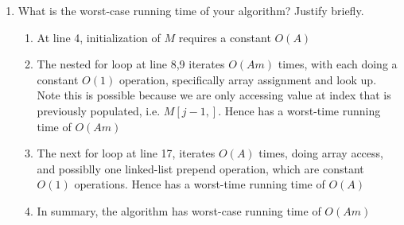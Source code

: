 \documentclass[11pt]{article}
\begin{document}
\begin{enumerate}
\begin{enumerate}
\begin{algorithm}[H]
{           $amount \leftarrow A$\\
           \\
         }
      \end{algorithm}
  \item \textbf{Proof of correctness for algorithm}
  \begin{proposition*}
    The dynamic programming algorithm specified above yields the optimal solution specified by the problem.
  \end{proposition*}
  \begin{proof}
    At each step $i$, the algorithm considers $C_i$, i.e. the set of coin values with index smaller or equal to $i$. For all $1\leq a \leq A$, assume $O_{i, a}$ are optimal solutions to $C_i$. The algorithm decides to keep coin $c_j$ based on two conditions. First, if the $i+1$th coin value is less than the amount specified, this is to make sure that inclusion of $i+1$ does not exceed the constraining amount $a$ instantly. And second, if the inclusion of $i+1$th coin together with the optimal solution to $C_1$ with amount reduced by exactly the coin value of $i+1$th coin, i.e. $C[j+1]$, yields a smaller list. Otherwise, the algorithm decides to skip the $i+1$-th coin value and continue until the entire coin value list is exhausted. To summarize, at each step, we are only adding $c_j$ if we arrive at a strictly smaller solution set such that the summation of coin values in the set equates to the constraining amount $A$. And since we start with specifying the size $m$ of the list and constraint $A$, the algorithm yields optimal result.
  \end{proof}

  \end{enumerate}
  \item What is the worst-case running time of your algorithm? Justify briefly.

  \begin{enumerate}
    \item At line 4, initialization of $M$ requires a constant $O(A)$
    \item The nested for loop at line 8,9 iterates $O(Am)$ times, with each doing a constant $O(1)$ operation, specifically array assignment and look up. Note this is possible because we are only accessing value at index that is previously populated, i.e. $M[j-1,]$. Hence has a worst-time running time of $O(Am)$
    \item The next for loop at line 17, iterates $O(A)$ times, doing array access, and possiblly one linked-list prepend operation, which are constant $O(1)$ operations. Hence has a worst-time running time of $O(A)$
    \item In summary, the algorithm has worst-case running time of $O(Am)$
  \end{enumerate}

\end{enumerate}
\end{document}
